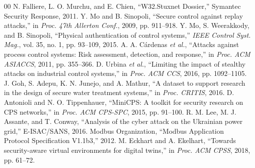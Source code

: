 \documentclass[conference]{IEEEtran}
\begin{document}
\begin{thebibliography}{00}
 N. Falliere, L. O. Murchu, and E. Chien, ``W32.Stuxnet Dossier,'' Symantec Security Response, 2011.
 Y. Mo and B. Sinopoli, ``Secure control against replay attacks,'' in \textit{Proc. 47th Allerton Conf.}, 2009, pp. 911--918.
 Y. Mo, S. Weerakkody, and B. Sinopoli, ``Physical authentication of control systems,'' \textit{IEEE Control Syst. Mag.}, vol. 35, no. 1, pp. 93--109, 2015.
 A. A. C\'ardenas \textit{et al.}, ``Attacks against process control systems: Risk assessment, detection, and response,'' in \textit{Proc. ACM ASIACCS}, 2011, pp. 355--366.
 D. Urbina \textit{et al.}, ``Limiting the impact of stealthy attacks on industrial control systems,'' in \textit{Proc. ACM CCS}, 2016, pp. 1092--1105.
 J. Goh, S. Adepu, K. N. Junejo, and A. Mathur, ``A dataset to support research in the design of secure water treatment systems,'' in \textit{Proc. CRITIS}, 2016.
 D. Antonioli and N. O. Tippenhauer, ``MiniCPS: A toolkit for security research on CPS networks,'' in \textit{Proc. ACM CPS-SPC}, 2015, pp. 91--100.
 R. M. Lee, M. J. Assante, and T. Conway, ``Analysis of the cyber attack on the Ukrainian power grid,'' E-ISAC/SANS, 2016.
 Modbus Organization, ``Modbus Application Protocol Specification V1.1b3,'' 2012.
 M. Eckhart and A. Ekelhart, ``Towards security-aware virtual environments for digital twins,'' in \textit{Proc. ACM CPSS}, 2018, pp. 61--72.
\end{thebibliography}
\end{document}
